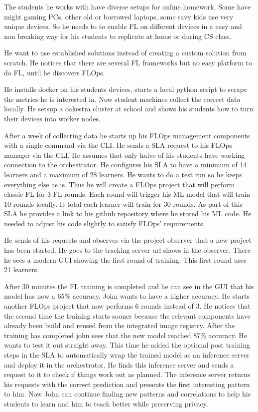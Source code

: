 The students he works with have diverse setups for online homework.
Some have might gaming PCs, other old or borrowed laptops, some savy kids use very unique devices.
So he needs to to enable FL on different devices in a easy and non breaking way for his students to replicate at home or during CS class.

He want to use established solutions instead of creating a custom solution from scratch.
He notices that there are several FL frameworks but no easy platform to do FL, until he discovers FLOps.

He installs docker on his students devices, starts a local python script to scrape the metrics he is interested in.
Now student machines collect the correct data locally.
He setsup a oakestra cluster at school and shows his students how to turn their devices into worker nodes.

After a week of collecting data he starts up his FLOps management components with a single command via the CLI.
He sends a SLA request to his FLOps manager via the CLI.
He assumes that only halve of his students have working connection to the orchestrator.
He configures his SLA to have a minimum of 14 learners and a maximum of 28 learners.
He wants to do a test run so he keeps everything else as is.
Thus he will create a FLOps project that will perform classic FL for 3 FL rounds.
Each round will trigger his ML model that will train 10 rounds locally.
It total each learner will train for 30 rounds.
As part of this SLA he provides a link to his github repository where he stored his ML code.
He needed to adjust his code slightly to satisfy FLOps' requirements.

He sends of his requests and observes via the project observer that a new project has been started.
He goes to the tracking server url shows in the observer.
There he sees a modern GUI showing the first round of training.
This first round uses 21 learners.

After 30 minutes the FL training is completed and he can see in the GUI that his model has now a 65\% accuracy.
John wants to have a higher accuracy.
He starts another FLOps project that now performs 6 rounds instead of 3.
He notices that the second time the training starts sooner because the relevant components have already been build and reused from the integrated image registry.
After the training has completed john sees that the new model reached 87\% accuracy.
He wants to test it out straight away.
This time he added the optional post training steps in the SLA to automatically wrap the trained model as an inference server and deploy it in the orchestrator.
He finds this inference server and sends a request to it to check if things work out as planned.
The inference server returns his requests with the correct prediction and presents the first interesting pattern to him.
Now John can continue finding new patterns and correlations to help his students to learn and him to teach better while preserving privacy.




